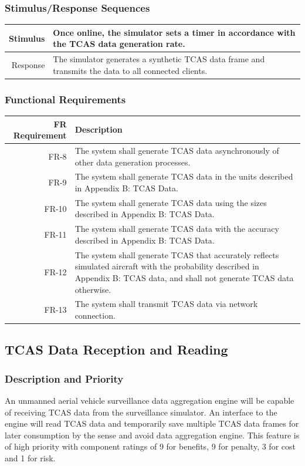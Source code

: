 \documentclass[12pt,oneside,letterpaper]{article}
\begin{document}
\subsubsection{Stimulus/Response Sequences}
\begin{longtable}{|r|p{3.8in}|}
\hline
Stimulus & Once online, the simulator sets a timer in accordance with the TCAS data generation rate. \\
\hline
Response & The simulator generates a synthetic TCAS data frame and transmits the data to all connected clients. \\
\hline
\end{longtable}
\subsubsection{Functional Requirements}
\begin{longtable}{|r|p{3.8in}|}
\hline
FR Requirement & Description \\
\hline
FR-8 & The system shall generate TCAS data asynchronously of other data generation processes. \\
\hline
FR-9 & The system shall generate TCAS data in the units described in Appendix B: TCAS Data. \\
\hline
FR-10 & The system shall generate TCAS data using the sizes described in Appendix B: TCAS Data. \\
\hline
FR-11 & The system shall generate TCAS data with the accuracy described in Appendix B: TCAS Data. \\
\hline
FR-12 & The system shall generate TCAS that accurately reflects simulated aircraft with the probability described in Appendix B: TCAS data, and shall not generate TCAS data otherwise. \\
\hline
FR-13 & The system shall transmit TCAS data via network connection. \\
\hline
\end{longtable}

\subsection{TCAS Data Reception and Reading}
\subsubsection{Description and Priority}
An unmanned aerial vehicle surveillance data aggregation engine will be capable of receiving TCAS data from the surveillance simulator. An interface to the engine will read TCAS data and temporarily save multiple TCAS data frames for later consumption by the sense and avoid data aggregation engine. This feature is of high priority with component ratings of 9 for benefits, 9 for penalty, 3 for cost and 1 for risk.
\end{document}
